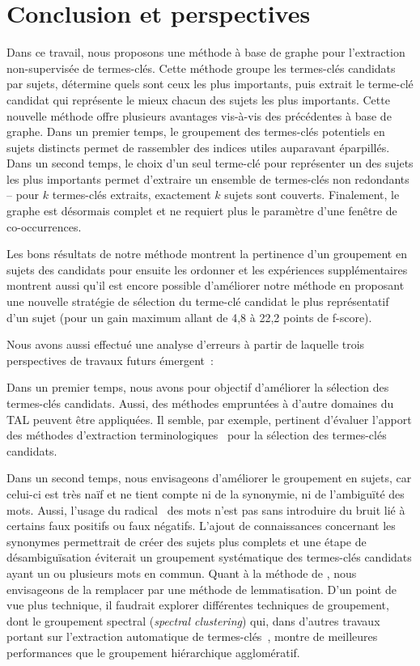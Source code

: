 \section{Conclusion et perspectives}
\label{sec:conclusion_et_perspectives}
  Dans ce travail, nous proposons une méthode à base de graphe pour
  l'extraction non-supervisée de termes-clés. Cette méthode groupe les
  termes-clés candidats par sujets, détermine quels sont ceux les plus
  importants, puis extrait le terme-clé candidat qui représente le mieux chacun
  des sujets les plus importants. Cette nouvelle méthode offre plusieurs
  avantages vis-à-vis des précédentes à base de graphe. Dans un premier temps,
  le groupement des termes-clés potentiels en sujets distincts permet de
  rassembler des indices utiles auparavant éparpillés. Dans un second temps,
  le choix d'un seul terme-clé pour représenter un des sujets les plus
  importants permet d'extraire un ensemble de termes-clés non redondants -- pour
  $k$ termes-clés extraits, exactement $k$ sujets sont couverts. Finalement, le
  graphe est désormais complet et ne requiert plus le paramètre d'une fenêtre de
  co-occurrences.

  Les bons résultats de notre méthode montrent la pertinence d'un groupement en
  sujets des candidats pour ensuite les ordonner et les expériences
  supplémentaires montrent aussi qu'il est encore possible d'améliorer notre
  méthode en proposant une nouvelle stratégie de sélection du terme-clé candidat
  le plus représentatif d'un sujet (pour un gain maximum allant de 4,8 à 22,2
  points de f-score).

  Nous avons aussi effectué une analyse d'erreurs à partir de laquelle trois
  perspectives de travaux futurs émergent~:

  Dans un premier temps, nous avons pour objectif d'améliorer la sélection des
  termes-clés candidats. Aussi, des méthodes empruntées à d'autre domaines du
  TAL peuvent être appliquées. Il semble, par exemple, pertinent d'évaluer
  l'apport des méthodes d'extraction
  terminologiques~\cite{castellvi2001automatictermdetection} pour la sélection
  des termes-clés candidats.
  
  Dans un second temps, nous envisageons d'améliorer le groupement en sujets,
  car celui-ci est très naïf et ne tient compte ni de la synonymie, ni de
  l'ambiguïté des mots. Aussi, l'usage du
  radical~\cite{porter1980suffixstripping} des mots n'est pas sans introduire du
  bruit lié à certains faux positifs ou faux négatifs. L'ajout de connaissances
  concernant les synonymes permettrait de créer des sujets plus complets et une
  étape de désambiguïsation éviterait un groupement systématique des termes-clés
  candidats ayant un ou plusieurs mots en commun. Quant à la méthode de
  , nous envisageons de la remplacer par une
  méthode de lemmatisation. D'un point de vue plus technique, il  faudrait
  explorer différentes techniques de groupement, dont le groupement spectral
  (\textit{spectral clustering}) qui, dans d'autres travaux portant sur
  l'extraction automatique de termes-clés~\cite{liu2009keycluster}, montre de
  meilleures performances que le groupement hiérarchique agglomératif.

